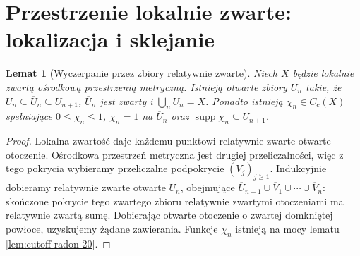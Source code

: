 \documentclass[11pt,a4paper,oneside]{book}
\numberwithin{equation}{chapter}
\theoremstyle{plain}
\newtheorem{lemat}[twierdzenie]{Lemat}
\theoremstyle{definition}
\theoremstyle{remark}
\begin{document}
\section{Przestrzenie lokalnie zwarte: lokalizacja i sklejanie}
\begin{lemat}[Wyczerpanie przez zbiory relatywnie zwarte]
\label{lem:exhaustion-21}
Niech $X$ będzie lokalnie zwartą ośrodkową przestrzenią
metryczną. Istnieją otwarte zbiory $U_n$ takie, że
$U_n\subseteq\overline U_n\subseteq U_{n+1}$,
$\overline U_n$ jest zwarty i $\bigcup_nU_n=X$.
Ponadto istnieją $\chi_n\in C_c(X)$ spełniające
$0\le\chi_n\le1$, $\chi_n=1$ na $\overline U_n$
oraz $\operatorname{supp}\chi_n\subseteq U_{n+1}$.
\end{lemat}
\begin{proof}
Lokalna zwartość daje każdemu punktowi relatywnie zwarte
otwarte otoczenie. Ośrodkowa przestrzeń metryczna jest
drugiej przeliczalności, więc z tego pokrycia wybieramy
przeliczalne podpokrycie $(V_j)_{j\ge1}$.
Indukcyjnie dobieramy relatywnie zwarte otwarte $U_n$,
obejmujące $\overline U_{n-1}\cup\overline V_1\cup\cdots
\cup\overline V_n$: skończone pokrycie tego zwartego
zbioru relatywnie zwartymi otoczeniami ma relatywnie
zwartą sumę. Dobierając otwarte otoczenie o zwartej
domkniętej powłoce, uzyskujemy żądane zawierania.
Funkcje $\chi_n$ istnieją na mocy lematu
\ref{lem:cutoff-radon-20}.
\end{proof}
\end{document}
